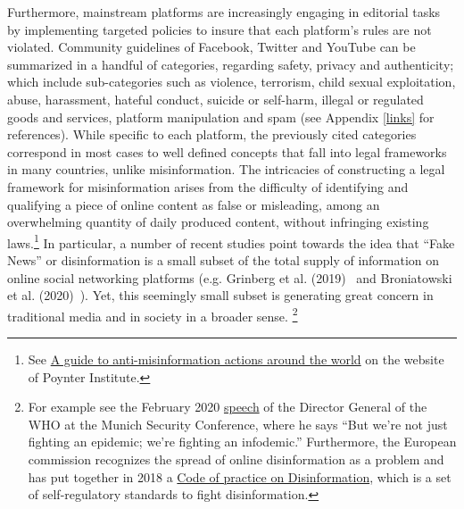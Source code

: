 \documentclass{article}
\begin{document}
Furthermore, mainstream platforms are increasingly engaging in editorial tasks by implementing targeted policies to insure that each platform's rules are not violated. Community guidelines of Facebook, Twitter and YouTube can be summarized in a handful of categories, regarding safety, privacy and authenticity; which include sub-categories such as violence, terrorism, child sexual exploitation, abuse, harassment, hateful conduct, suicide or self-harm, illegal or regulated goods and services, platform manipulation and spam (see Appendix \ref{links} for references). While specific to each platform, the previously cited categories correspond in most cases to well defined concepts that fall into legal frameworks in many countries, unlike misinformation. The intricacies of constructing a legal framework for misinformation arises from the difficulty of identifying and qualifying a piece of online content as false or misleading, among an overwhelming quantity of daily produced content, without infringing existing laws.\footnote{See \href{https://www.poynter.org/ifcn/anti-misinformation-actions/}{A guide to anti-misinformation actions around the world} on the website of Poynter Institute.} In particular, a number of recent studies  point towards the idea that ``Fake News'' or disinformation is a small subset of the total supply of information on online social networking platforms (e.g. Grinberg et al. (2019)~\cite{grinberg} and Broniatowski et al. (2020)~\cite{broniatowski}). Yet, this seemingly small subset is generating great concern in traditional media and in society in a broader sense. \footnote{For example see the February 2020 \href{https://www.who.int/director-general/speeches/detail/munich-security-conference}{speech} of the Director General of the WHO at the Munich Security Conference, where he says ``But we’re not just fighting an epidemic; we’re fighting an infodemic.'' Furthermore, the European commission recognizes the spread of online disinformation as a problem and has put together in 2018 a \href{https://digital-strategy.ec.europa.eu/en/policies/code-practice-disinformation}{Code of practice on Disinformation}, which is a set of self-regulatory standards to fight disinformation.}

\smallskip
\end{document}
